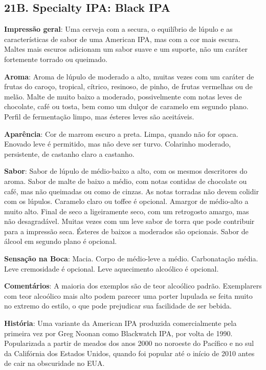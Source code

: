 \subsection*{21B. Specialty IPA: Black IPA}
\textbf{Impressão geral}: Uma cerveja com a secura, o equilíbrio de lúpulo e as características de sabor de uma American IPA, mas com a cor mais escura. Maltes mais escuros adicionam um sabor suave e um suporte, não um caráter fortemente torrado ou queimado.

\textbf{Aroma}: Aroma de lúpulo de moderado a alto, muitas vezes com um caráter de frutas do caroço, tropical, cítrico, resinoso, de pinho, de frutas vermelhas ou de melão. Malte de muito baixo a moderado, possivelmente com notas leves de chocolate, café ou tosta, bem como um dulçor de caramelo em segundo plano. Perfil de fermentação limpo, mas ésteres leves são aceitáveis.

\textbf{Aparência}: Cor de marrom escuro a preta. Limpa, quando não for opaca. Enovado leve é permitido, mas não deve ser turvo. Colarinho moderado, persistente, de castanho claro a castanho.

\textbf{Sabor}: Sabor de lúpulo de médio-baixo a alto, com os mesmos descritores do aroma. Sabor de malte de baixo a médio, com notas contidas de chocolate ou café, mas não queimadas ou como de cinzas. As notas torradas não devem colidir com os lúpulos. Caramelo claro ou toffee é opcional. Amargor de médio-alto a muito alto. Final de seco a ligeiramente seco, com um retrogosto amargo, mas não desagradável. Muitas vezes com um leve sabor de torra que pode contribuir para a impressão seca. Ésteres de baixos a moderados são opcionais. Sabor de álcool em segundo plano é opcional.

\textbf{Sensação na Boca}: Macia. Corpo de médio-leve a médio. Carbonatação média. Leve cremosidade é opcional. Leve aquecimento alcoólico é opcional.

\textbf{Comentários}: A maioria dos exemplos são de teor alcoólico padrão. Exemplarers com teor alcoólico mais alto podem parecer uma porter lupulada se feita muito no extremo do estilo, o que pode prejudicar sua facilidade de ser bebida.

\textbf{História}: Uma variante da American IPA produzida comercialmente pela primeira vez por Greg Noonan como Blackwatch IPA, por volta de 1990. Popularizada a partir de meados dos anos 2000 no noroeste do Pacífico e no sul da Califórnia dos Estados Unidos, quando foi popular até o início de 2010 antes de cair na obscuridade no EUA.

